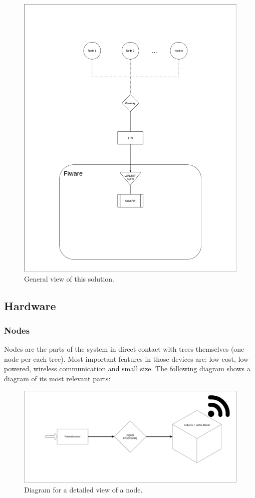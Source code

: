 \documentclass[11pt,a4paper,dvipsnames,twoside]{article}
\begin{document}
\begin{figure}[htp]
  \centering
  \includegraphics[width=.73\textwidth]{../../schemes/main_scheme_tbg.png}
  \caption{General view of this solution.}
  \label{fig:GenView}
\end{figure}

\subsection{Hardware}

\subsubsection{Nodes}
Nodes are the parts of the system in direct contact with trees themselves (one node per each tree). Most important features in those devices are: low-cost, low-powered, wireless communication and small size. The following diagram shows a diagram of its most relevant parts:

\begin{figure}[htp]
  \centering
  \includegraphics[width=.9\textwidth]{../../schemes/node_tbg.png}
  \caption{Diagram for a detailed view of a node.}
  \label{fig:NodeDiag}
\end{figure}
\end{document}
